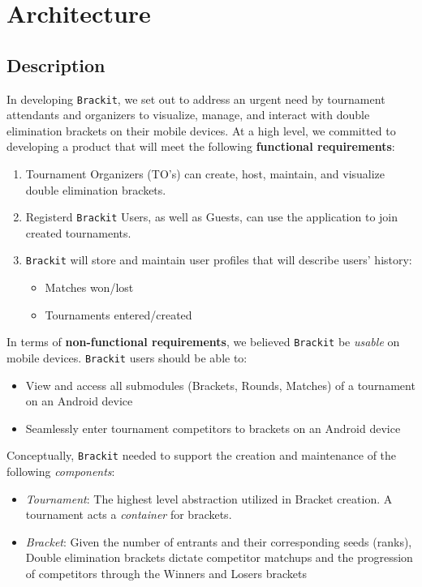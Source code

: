 \documentclass{article}
\begin{document}
\section{Architecture}
\subsection{Description}
In developing \texttt{Brackit}, we set out to address an urgent need by tournament attendants and organizers to visualize, manage, and interact with double elimination
brackets on their mobile devices. At a high level, we committed to developing a product that will meet the following \textbf{functional requirements}:
\begin{enumerate}
    \item{Tournament Organizers (TO's) can create, host, maintain, and visualize double elimination brackets.}
    \item{Registerd \texttt{Brackit} Users, as well as Guests, can use the application to join created tournaments.}
    \item{\texttt{Brackit} will store and maintain user profiles that will describe users' history:
    \begin{itemize}
        \item{Matches won/lost}
        \item{Tournaments entered/created}
    \end{itemize}
    }
\end{enumerate}
In terms of \textbf{non-functional requirements}, we believed \texttt{Brackit} be \textit{usable} on mobile devices. \texttt{Brackit} users should be able to:
\begin{itemize}
    \item{View and access all submodules (Brackets, Rounds, Matches) of a tournament on an Android device}
    \item{Seamlessly enter tournament competitors to brackets on an Android device}
\end{itemize}

Conceptually, \texttt{Brackit} needed to support the creation and maintenance of the following \textit{components}:
\begin{itemize}
    \item{\textit{Tournament}: The highest level abstraction utilized in Bracket creation. A tournament acts a \textit{container} for brackets.}
    \item{\textit{Bracket}: Given the number of entrants and their corresponding seeds (ranks), 
    Double elimination brackets dictate competitor matchups and the progression of competitors through the Winners and Losers brackets }
    
\end{itemize}  
\end{document}
